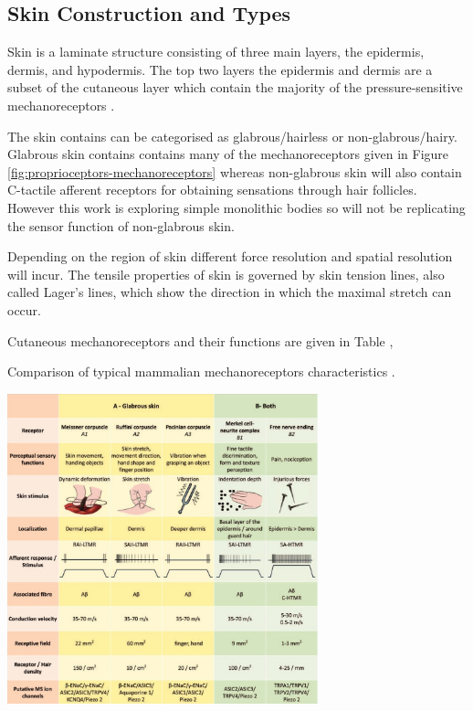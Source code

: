 \subsection{Skin Construction and Types}
Skin is a laminate structure consisting of three main layers, the epidermis, dermis, and hypodermis. The top two layers the epidermis and dermis are a subset of the cutaneous layer which contain the majority of the pressure-sensitive mechanoreceptors \cite{}.

The skin contains can be categorised as glabrous/hairless or non-glabrous/hairy. Glabrous skin contains contains many of the mechanoreceptors given in Figure \ref{fig:proprioceptors-mechanoreceptors} whereas non-glabrous skin will also contain C-tactile afferent receptors for obtaining sensations through hair follicles. However this work is exploring simple monolithic bodies so will not be replicating the sensor function of non-glabrous skin.

Depending on the region of skin different force resolution and spatial resolution will incur. The tensile properties of skin is governed by skin tension lines, also called Lager's lines, which show the direction in which the maximal stretch can occur. 

Cutaneous mechanoreceptors and their functions are given in Table ,
\begin{table}[H]
    \centering
    \caption{Comparison of typical mammalian mechanoreceptors characteristics \cite{Roudaut2012}.}
    \label{tab:mechanoreceptors-table}
    \includegraphics[width=9cm]{Figures/mechanoreceptors-table-cropped.jpg}
\end{table}


